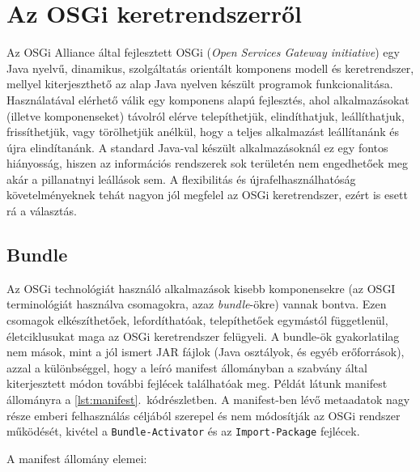 \chapter{Az OSGi keretrendszerről}
\label{cha:osgi}

Az OSGi Alliance \cite{osgi} által fejlesztett OSGi (\textit{Open Services Gateway initiative}) egy Java nyelvű, dinamikus, szolgáltatás orientált komponens modell és keretrendszer, mellyel kiterjeszthető az alap Java nyelven készült programok funkcionalitása. Használatával elérhető válik egy komponens alapú fejlesztés, ahol alkalmazásokat (illetve komponenseket) távolról elérve telepíthetjük, elindíthatjuk, leállíthatjuk, frissíthetjük, vagy törölhetjük anélkül, hogy a teljes alkalmazást leállítanánk és újra elindítanánk. A standard Java-val készült alkalmazásoknál ez egy fontos hiányosság, hiszen az információs rendszerek sok területén nem engedhetőek meg akár a pillanatnyi leállások sem. A flexibilitás és újrafelhasználhatóság követelményeknek tehát nagyon jól megfelel az OSGi keretrendszer, ezért is esett rá a választás.

\section{Bundle}
\label{sec:bundle}

Az OSGi technológiát \cite{osgiintro} használó alkalmazások kisebb komponensekre (az OSGI terminológiát használva csomagokra, azaz \textit{bundle}-ökre) vannak bontva. Ezen csomagok elkészíthetőek, lefordíthatóak, telepíthetőek egymástól függetlenül, életciklusukat maga az OSGi keretrendszer felügyeli. A bundle-ök gyakorlatilag nem mások, mint a jól ismert JAR fájlok (Java osztályok, és egyéb erőforrások), azzal a különbséggel, hogy a leíró manifest állományban a szabvány által kiterjesztett módon további fejlécek találhatóak meg. Példát látunk manifest állományra a \ref{lst:manifest}.~kódrészletben. A manifest-ben lévő metaadatok nagy része emberi felhasználás céljából szerepel és nem módosítják az OSGi rendszer működését, kivétel a \texttt{Bundle-Activator} és az \texttt{Import-Package} fejlécek.

A manifest állomány elemei:

